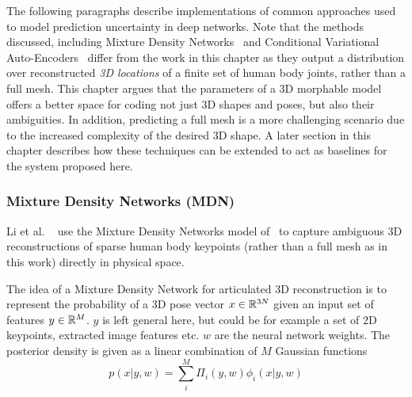 The following paragraphs describe implementations of common approaches used to model prediction uncertainty in deep networks. Note that the methods discussed, including Mixture Density Networks~\cite{bishop94mixture,li19generating} and Conditional Variational Auto-Encoders~\cite{sharma19monocular} differ from the work in this chapter as they output a distribution over reconstructed \emph{3D locations} of a finite set of human body joints, rather than a full mesh. This chapter argues that the parameters of a 3D morphable model offers a better space for coding not just 3D shapes and poses, but also their ambiguities. In addition, predicting a full mesh is a more challenging scenario due to the increased complexity of the desired 3D shape. A later section in this chapter describes how these techniques can be extended to act as baselines for the system proposed here. 




\subsubsection{Mixture Density Networks (MDN)}

Li et al. ~\cite{li19generating} use the Mixture Density Networks model of~\cite{bishop94mixture} to capture ambiguous 3D reconstructions of sparse human body keypoints (rather than a full mesh as in this work) directly in physical space. 

The idea of a Mixture Density Network for articulated 3D reconstruction is to represent the probability of a 3D pose vector $x \in {\mathbb{R}^{3N}}$ given an input set of features $y \in {\mathbb{R}^{M}}$. $y$ is left general here, but could be for example a set of 2D keypoints, extracted image features etc. $w$ are the neural network weights. The posterior density is given as a linear combination of $M$ Gaussian functions
\begin{equation}
  p(x | y, w) = \sum_{i}^{M} \Pi_{i}(y, w)\phi_{i}(x | y, w)
\end{equation}

